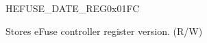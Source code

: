 \begin{register}{H}{EFUSE\_DATE\_REG}{0x01FC}\label{regdesc:EFUSEDATEREG}
%
%
\regnewline%
\begin{regdesc}\begin{reglist}
\label{fielddesc:EFUSEDATE}\item [EFUSE\_DATE] Stores eFuse controller register version. (R/W)
\end{reglist}\end{regdesc}
\end{register}



